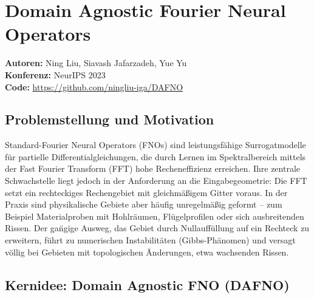 \documentclass[a4paper,12pt]{article}
\begin{document}
\section*{Domain Agnostic Fourier Neural Operators}
\textbf{Autoren:} Ning Liu, Siavash Jafarzadeh, Yue Yu \\
\textbf{Konferenz:} NeurIPS 2023 \\
\textbf{Code:} \url{https://github.com/ningliu-iga/DAFNO}

\subsection*{Problemstellung und Motivation}

Standard-Fourier Neural Operators (FNOs) sind leistungsf\"ahige Surrogat\-modelle
f\"ur partielle Differentialgleichungen, die durch Lernen im Spektralbereich mittels
der Fast Fourier Transform (FFT) hohe Recheneffizienz erreichen. Ihre zentrale
Schwachstelle liegt jedoch in der Anforderung an die Eingabegeometrie: Die FFT
setzt ein rechteckiges Rechengebiet mit gleichm\"a\ss{}igem Gitter voraus. In der
Praxis sind physikalische Gebiete aber h\"aufig unregelm\"a\ss{}ig geformt -- zum
Beispiel Materialproben mit Hohlr\"aumen, Fl\"ugelprofilen oder sich ausbreitenden
Rissen. Der ga\"ngige Ausweg, das Gebiet durch Nullauff\"ullung auf ein Rechteck zu
erweitern, f\"uhrt zu numerischen Instabilit\"aten (Gibbs-Ph\"anomen) und versagt
v\"ollig bei Gebieten mit topologischen \"Anderungen, etwa wachsenden Rissen.

\subsection*{Kernidee: Domain Agnostic FNO (DAFNO)}
\end{document}
